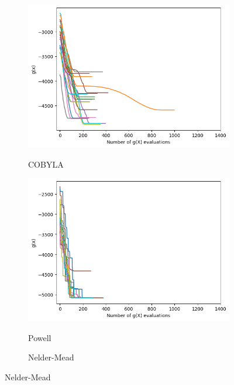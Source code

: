 \begin{figure}[!h]
     \centering
     \begin{subfigure}[b]{0.49\textwidth}
         \centering
         \caption{COBYLA}
         \includegraphics[width=\textwidth]{image/75gprCOBYLA_itrs.png}
         \label{fig:conv_cobyla}
     \end{subfigure}
     \hfill
     \begin{subfigure}[b]{0.49\textwidth}
         \centering
         \caption{Powell}
         \includegraphics[width=\textwidth]{image/75gprPowell_itrs.png}
         \label{fig:conv_powell}
     \end{subfigure}
     \vfill
     \begin{subfigure}[b]{0.49\textwidth}
         \centering
         \caption{Nelder-Mead}

\end{subfigure}
\end{figure}
